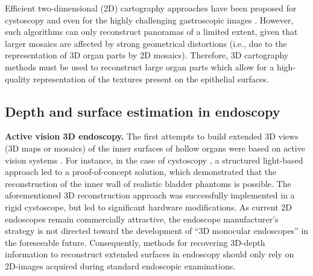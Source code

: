 \documentclass[a4paper,fleqn]{cas-dc}
\begin{document}
Efficient two-dimensional (2D) cartography approaches have been proposed for cystoscopy \citep{Miranda_TBME_2008, Behrens_CSRD_2011, Ali_PR_2016} and even for the highly challenging gastroscopic images \citep{Trinh_ICIP_2018, Zenteno_CBM_2022}. However, such algorithms can only reconstruct panoramas of a limited extent, given that larger mosaics are affected by strong geometrical distortions (i.e., due to the representation of 3D organ parts by 2D mosaics). Therefore, 3D cartography methods must be used to reconstruct large organ parts which allow for a high-quality representation of the textures present on the epithelial surfaces.     

\subsection{Depth and surface estimation in endoscopy}
%
\textbf{Active vision 3D endoscopy.} The first attempts to build extended 3D views (3D maps or mosaics) of the inner surfaces of hollow organs were based on active vision systems \citep{Penne_MICCAI_2009, BenHammadou_CVIU_2013}. For instance, in the case of cystoscopy \citep{ BenHammadou_3DResearch_2016}, a structured light-based approach led to a proof-of-concept solution, which demonstrated that the reconstruction of the inner wall of realistic bladder phantoms is possible. The aforementioned 3D reconstruction approach was successfully implemented in a rigid cystoscope, but led to significant hardware modifications. As current 2D endoscopes remain commercially attractive, the  endoscope manufacturer's strategy is not directed toward the development of ``3D monocular endoscopes'' in the foreseeable future. Consequently, methods for recovering 3D-depth information to reconstruct extended surfaces in endoscopy should only rely on 2D-images acquired during  standard endoscopic examinations.
\end{document}

